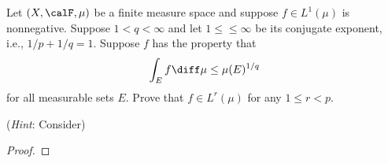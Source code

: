 \begin{problem}
Let $(X,\calF,\mu)$ be a finite measure space and suppose $f\in L^1(\mu)$
is nonnegative. Suppose $1<q<\infty$ and let $1\leq \leq\infty$ be its
conjugate exponent, i.e., $1/p+1/q=1$. Suppose $f$ has the property that
\[
\int_Ef\diff\mu\leq \mu(E)^{1/q}
\]
for all measurable sets $E$. Prove that $f\in L^r(\mu)$ for any $1\leq
r<p$.

(\emph{Hint}: Consider)
\end{problem}
\begin{proof}
\end{proof}

